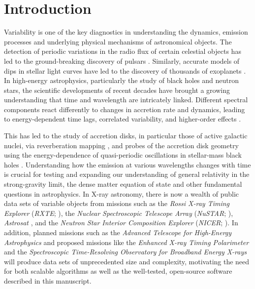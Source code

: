 \documentclass[twocolumn]{aastex62}
\newcommand{\project}[1]{\textsl{#1}\xspace}
\newcommand{\nustar}{\project{NuSTAR}\xspace}
\begin{document}
\section{Introduction} \label{sec:intro}

Variability is one of the key diagnostics in understanding the dynamics, emission processes and underlying physical mechanisms of astronomical objects. 
The detection of periodic variations in the radio flux of certain celestial objects has led to the ground-breaking discovery of pulsars \citep{hewish1968}. 
Similarly, accurate models of dips in stellar light curves have led to the discovery of thousands of exoplanets \citep[e.g.,][]{charbonneau2000,henry2000,coughlin2016}. 
In high-energy astrophysics, particularly the study of black holes and neutron stars, the scientific developments of recent decades have brought a growing understanding that time and wavelength are intricately linked. 
Different spectral components react differently to changes in accretion rate and dynamics, leading to energy-dependent time lags, correlated variability, and higher-order effects \citep[for a review, see][]{uttley2014}. 

This has led to the study of accretion disks, in particular those of active galactic nuclei, via reverberation mapping \citep[e.g.,][]{blandford1982,Bentz2016}, and probes of the accretion disk geometry using the energy-dependence of quasi-periodic oscillations in stellar-mass black holes \citep[e.g.,][]{ingram2015,stevensuttley2016}. 
Understanding how the emission at various wavelengths changes with time is crucial for testing and expanding our understanding of general relativity in the strong-gravity limit, the dense matter equation of state and other fundamental questions in astrophysics.
In X-ray astronomy, there is now a wealth of public data sets of variable objects from missions such as the \textit{Rossi X-ray Timing Explorer}  (\textit{RXTE}; \citealt{Bradtetal93}), the \textit{Nuclear Spectroscopic Telescope Array} (\nustar; \citealt{nustar13}), \textit{Astrosat} \citep{singh2014}, and the \textit{Neutron Star Interior Composition Explorer} (\textit{NICER}; \citealt{gendreau2016}). 
In addition, planned missions such as the \textit{Advanced Telescope for High-Energy Astrophysics} \citep[\textit{Athena};][]{athenaXIFU} and proposed missions like the \textit{Enhanced X-ray Timing Polarimeter} \citep[\textit{eXTP};][]{extp16} and the \textit{Spectroscopic Time-Resolving Observatory for Broadband Energy X-rays} \citep[\textit{STROBE-X};][]{strobex18} will produce data sets of unprecedented size and complexity, motivating the need for both scalable algorithms as well as the well-tested, open-source software described in this manuscript.
\end{document}
